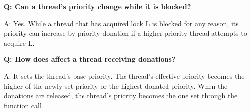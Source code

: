 \textbf{Q: Can a thread’s priority change while it is blocked?}

A: Yes. While a thread that has acquired lock L is blocked for any reason, its priority can increase
by priority donation if a higher-priority thread attempts to acquire L.

\newline


\textbf{Q: How does  affect a thread receiving donations?}

A: It sets the thread’s base priority. The thread’s effective priority becomes the higher of the 
newly set priority or the highest donated priority. When the donations are released, the thread’s 
priority becomes the one set through the function call.